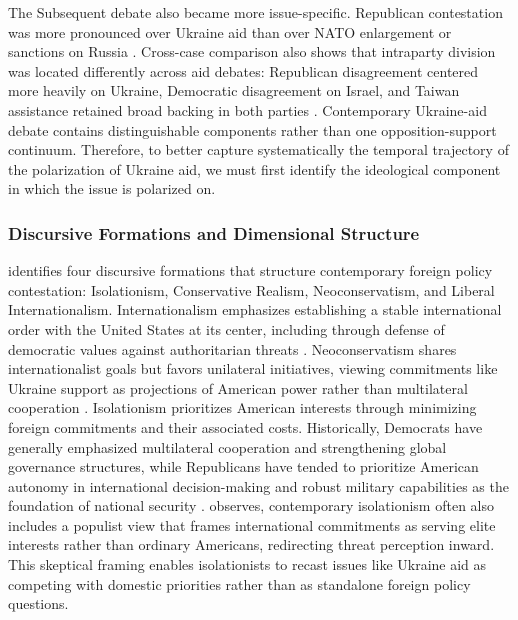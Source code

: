 The Subsequent debate also became more issue-specific. Republican contestation was more pronounced over Ukraine aid than over NATO enlargement or sanctions on Russia \citep{riegerManchurianCandidateGOPs2025}. Cross-case comparison also shows that intraparty division was located differently across aid debates: Republican disagreement centered more heavily on Ukraine, Democratic disagreement on Israel, and Taiwan assistance retained broad backing in both parties \citep{tamaBipartisanshipPutTest2025}. Contemporary Ukraine-aid debate contains distinguishable components rather than one opposition-support continuum. Therefore, to better capture systematically the temporal trajectory of the polarization of Ukraine aid, we must first identify the ideological component in which the issue is polarized on.

\subsubsection{Discursive Formations and Dimensional Structure}

\citet{riegerTheyShouldntReceive2025} identifies four discursive formations that structure contemporary foreign policy contestation: Isolationism, Conservative Realism, Neoconservatism, and Liberal Internationalism. Internationalism emphasizes establishing a stable international order with the United States at its center, including through defense of democratic values against authoritarian threats \citep{coxUSForeignPolicy2018}. Neoconservatism shares internationalist goals but favors unilateral initiatives, viewing commitments like Ukraine support as projections of American power rather than multilateral cooperation \citep{khongNeoconservatismDomesticSources2008}. Isolationism prioritizes American interests through minimizing foreign commitments and their associated costs. Historically, Democrats have generally emphasized multilateral cooperation and strengthening global governance structures, while Republicans have tended to prioritize American autonomy in international decision-making and robust military capabilities as the foundation of national security \citep{smeltzDividedWeStand2020}. \citet{meadJacksonianRevoltAmerican2017} observes, contemporary isolationism often also includes a populist view that frames international commitments as serving elite interests rather than ordinary Americans, redirecting threat perception inward. This skeptical framing enables isolationists to recast issues like Ukraine aid as competing with domestic priorities rather than as standalone foreign policy questions.

